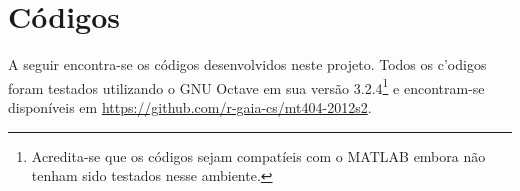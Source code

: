 \documentclass[12pt,a4paper]{article}
\begin{document}
\clearpage
\section{C\'{o}digos}
A seguir encontra-se os c\'{o}digos desenvolvidos neste projeto. Todos os c'{o}digos
foram testados utilizando o GNU Octave em sua vers\~{a}o
3.2.4\footnote{Acredita-se que os c\'{o}digos sejam compat\'{i}eis com o MATLAB
embora n\~{a}o tenham sido testados nesse ambiente.} e encontram-se
dispon\'{i}veis em \url{https://github.com/r-gaia-cs/mt404-2012s2}.


\end{document}
